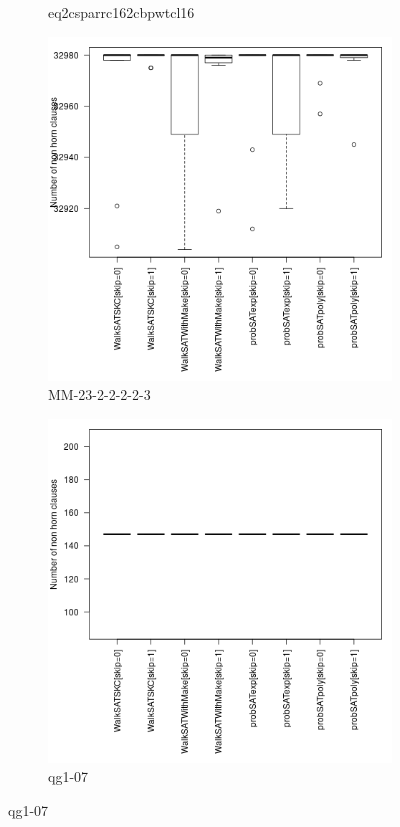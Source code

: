 \documentclass[12pt,a4paper]{article}
\begin{document}
\begin{figure}[H]
\begin{subfigure}{0.4\textwidth}
    \caption{eq2csparrc162cbpwtcl16}
  \end{subfigure}
  
  \begin{subfigure}{0.4\textwidth}
    \includegraphics[width=\textwidth]{boxplots/boxPlotMM-23-2-2-2-2-3.png}
    \caption{MM-23-2-2-2-2-3}
  \end{subfigure}
  \begin{subfigure}{0.4\textwidth}
    \includegraphics[width=\textwidth]{boxplots/boxPlotqg1-07.png}
    \caption{qg1-07}
  \end{subfigure}
\end{figure}
\end{document}
